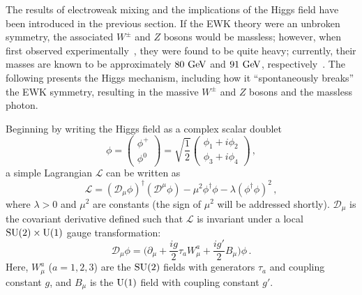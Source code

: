 ﻿%

The results of electroweak mixing and the implications of the Higgs field have been introduced in the previous section.
If the EWK theory were an unbroken symmetry, the associated $W^{\pm}$ and $Z$ bosons would be massless; however, when first observed experimentally~\cite{1983.w-boson, 1983.z-boson}, they were found to be quite heavy; currently, their masses are known to be approximately $80\gev$ and $91\gev$, respectively~\cite{2014.pdg}.
The following presents the Higgs mechanism, including how it ``spontaneously breaks'' the EWK symmetry, resulting in the massive $W^\pm$ and $Z$ bosons and the massless photon.

Beginning by writing the Higgs field as a complex scalar doublet %
\begin{equation}
  \phi = 
  \begin{pmatrix}
    \phi^{+} \\
    \phi^{0}
  \end{pmatrix}
  = \sqrt{\frac{1}{2}}
  \begin{pmatrix}
    \phi_1 + i\phi_2 \\
    \phi_3 + i\phi_4
  \end{pmatrix}\,,
  \label{eq:complex_scalar_doublet}
\end{equation}
a simple Lagrangian $\mathcal{L}$ can be written as
\begin{equation}
  \mathcal{L} = (\mathcal{D}_\mu\phi)^\dagger (\mathcal{D}^\mu\phi) - \mu^2\phi^{\dagger}\phi-\lambda (\phi^{\dagger}\phi)^2\,,
  \label{eq:complex_scalar_lagrangian}
\end{equation}
where $\lambda > 0$ and $\mu^2$ are constants (the sign of $\mu^2$ will be addressed shortly).
$\mathcal{D}_{\mu}$ is the covariant derivative defined such that $\mathcal{L}$ is invariant under a local $\textrm{SU}(2)\times\textrm{U}(1)$ gauge transformation:
\begin{equation}
  \mathcal{D}_{\mu}\phi = \bigg(\partial_{\mu} + \frac{ig}{2}\tau_a W_{\mu}^a + \frac{ig'}{2}B_{\mu}\bigg)\phi\,.
  \label{eq:covariant_deriv}
\end{equation}
Here, $W_{\mu}^a$ ($a=1,2,3$) are the $\textrm{SU}(2)$ fields with generators $\tau_a$ and coupling constant $g$, and $B_{\mu}$ is the $\textrm{U}(1)$ field with coupling constant $g'$.

